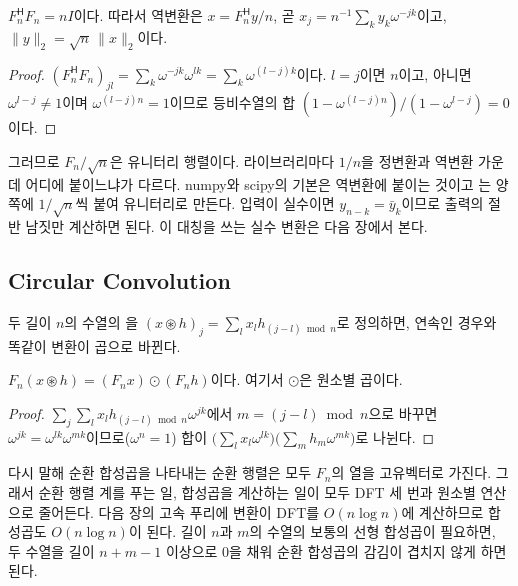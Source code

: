 \begin{proposition}
\label{prop:dft-unitary}
$F_n^{\mathsf H}F_n=nI$이다. 따라서 역변환은 $x=F_n^{\mathsf H}y/n$, 곧 $x_j=n^{-1}\sum_ky_k\omega^{-jk}$이고, $\|y\|_2=\sqrt n\,\|x\|_2$이다.
\end{proposition}

\begin{proof}
$(F_n^{\mathsf H}F_n)_{jl}=\sum_k\omega^{-jk}\omega^{lk}=\sum_k\omega^{(l-j)k}$이다. $l=j$이면 $n$이고, 아니면 $\omega^{l-j}\ne1$이며 $\omega^{(l-j)n}=1$이므로 등비수열의 합 $(1-\omega^{(l-j)n})/(1-\omega^{l-j})=0$이다.
\end{proof}

그러므로 $F_n/\sqrt n$은 유니터리 행렬이다. 라이브러리마다 $1/n$을 정변환과 역변환 가운데 어디에 붙이느냐가 다르다. numpy와 scipy의 기본은 역변환에 붙이는 것이고 는 양쪽에 $1/\sqrt n$씩 붙여 유니터리로 만든다. 입력이 실수이면 $y_{n-k}=\bar y_k$이므로 출력의 절반 남짓만 계산하면 된다. 이 대칭을 쓰는 실수 변환은 다음 장에서 본다.

\subsection{Circular Convolution}

두 길이 $n$의 수열의 을 $(x\circledast h)_j=\sum_lx_lh_{(j-l)\bmod n}$로 정의하면, 연속인 경우와 똑같이 변환이 곱으로 바뀐다.

\begin{proposition}
\label{prop:circular-convolution}
$F_n(x\circledast h)=(F_nx)\odot(F_nh)$이다. 여기서 $\odot$은 원소별 곱이다.
\end{proposition}

\begin{proof}
$\sum_j\sum_lx_lh_{(j-l)\bmod n}\omega^{jk}$에서 $m=(j-l)\bmod n$으로 바꾸면 $\omega^{jk}=\omega^{lk}\omega^{mk}$이므로($\omega^n=1$) 합이 $\bigl(\sum_lx_l\omega^{lk}\bigr)\bigl(\sum_mh_m\omega^{mk}\bigr)$로 나뉜다.
\end{proof}

다시 말해 순환 합성곱을 나타내는 순환 행렬은 모두 $F_n$의 열을 고유벡터로 가진다. 그래서 순환 행렬 계를 푸는 일, 합성곱을 계산하는 일이 모두 DFT 세 번과 원소별 연산으로 줄어든다. 다음 장의 고속 푸리에 변환이 DFT를 $O(n\log n)$에 계산하므로 합성곱도 $O(n\log n)$이 된다. 길이 $n$과 $m$의 수열의 보통의 선형 합성곱이 필요하면, 두 수열을 길이 $n+m-1$ 이상으로 $0$을 채워 순환 합성곱의 감김이 겹치지 않게 하면 된다.

